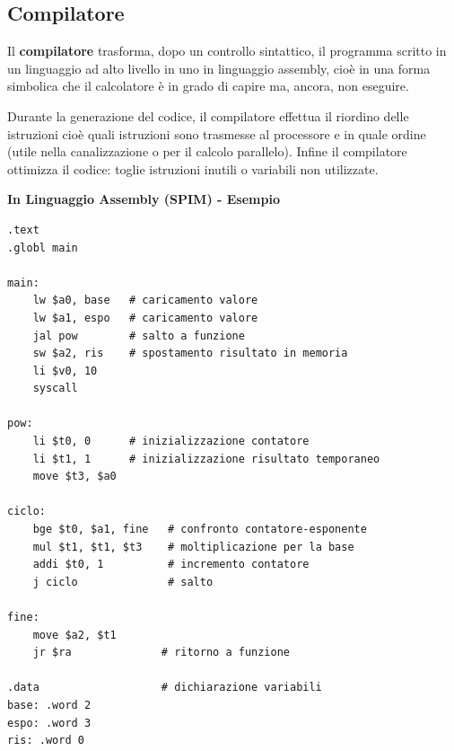 \documentclass[12pt]{article} %
\begin{document}
\subsection{Compilatore}
Il \textbf{compilatore} trasforma, dopo un controllo sintattico, il programma scritto in un linguaggio ad alto livello in uno in linguaggio assembly, cioè in una forma simbolica che il calcolatore è in grado di capire ma, ancora, non eseguire.\par\medskip\noindent 
Durante la generazione del codice, il compilatore effettua il riordino delle istruzioni cioè quali istruzioni sono trasmesse al processore e in quale ordine (utile nella canalizzazione o per il calcolo parallelo). Infine il compilatore ottimizza il codice: toglie istruzioni inutili o variabili non utilizzate.\par\medskip\noindent
\textbf{In Linguaggio Assembly (SPIM) - Esempio }
\begin{lstlisting}
.text
.globl main

main:
    lw $a0, base   # caricamento valore
    lw $a1, espo   # caricamento valore
    jal pow        # salto a funzione
    sw $a2, ris    # spostamento risultato in memoria
    li $v0, 10
    syscall

pow:
    li $t0, 0      # inizializzazione contatore
    li $t1, 1      # inizializzazione risultato temporaneo
    move $t3, $a0

ciclo:
    bge $t0, $a1, fine   # confronto contatore-esponente
    mul $t1, $t1, $t3    # moltiplicazione per la base
    addi $t0, 1          # incremento contatore
    j ciclo              # salto

fine:
    move $a2, $t1
    jr $ra              # ritorno a funzione

.data                   # dichiarazione variabili
base: .word 2
espo: .word 3
ris: .word 0
\end{lstlisting}
\newpage
\end{document}

